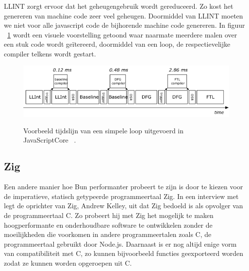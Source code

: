 LLINT zorgt ervoor dat het geheugengebruik wordt gereduceerd. Zo kost het genereren van machine code zeer veel geheugen.
Doormiddel van LLINT moeten we niet voor alle javascript code de bijhorende machine code genereren.
In figuur ~\ref{fig:javascriptcore} wordt een visuele voorstelling getoond 
waar naarmate meerdere malen over een stuk code wordt geïtereerd, doormiddel van een loop, de respectievelijke compiler telkens wordt gestart.
\begin{figure}[H]
    \centering
    \includegraphics[width=.9\textwidth]{graphics/javascriptcore.png}
    \caption{\label{fig:javascriptcore}}Voorbeeld tijdslijn van een simpele loop uitgevoerd in JavaScriptCore ~\autocite{Pizlo2020}.
\end{figure}

\subsection{Zig}
Een andere manier hoe Bun performanter probeert te zijn is door te kiezen voor de imperatieve, statisch getypeerde programmeertaal Zig. 
In een interview met ~\textcite{Motroc2017} legt de oprichter van Zig, Andrew Kelley, uit dat Zig bedoeld is als opvolger van de programmeertaal C.
Zo probeert hij met Zig het mogelijk te maken hoogperformante en onderhoudbare software te ontwikkelen 
zonder de moeilijkheden die voorkomen in andere programmeertalen zoals C, de programmeertaal gebruikt door Node.js.
Daarnaast is er nog altijd enige vorm van compatibiliteit met C, 
zo kunnen bijvoorbeeld functies geexporteerd worden zodat ze kunnen worden opgeroepen uit C.

